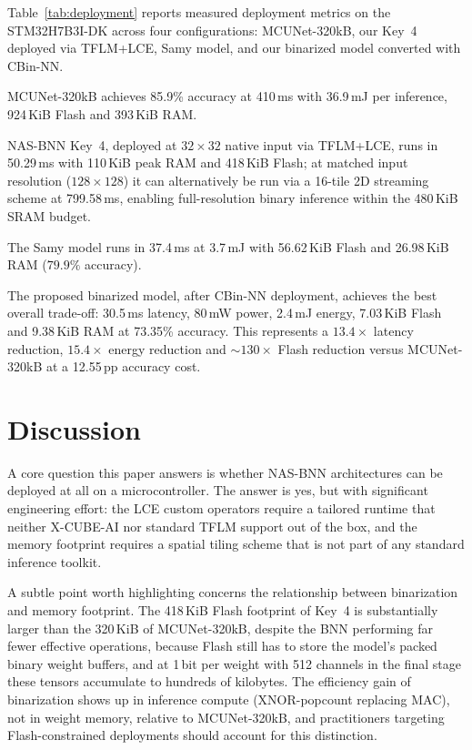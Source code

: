 \documentclass[conference]{IEEEtran}
\newcommand{\STMLATAVG}{50.29\,ms}
\newcommand{\STMARENAKIB}{110\,KiB}
\begin{document}
Table~\ref{tab:deployment} reports measured deployment metrics on the STM32H7B3I-DK across four configurations: MCUNet-320kB, our Key~4 deployed via TFLM+LCE, Samy model, and our binarized model converted with CBin-NN.

MCUNet-320kB achieves 85.9\% accuracy at 410\,ms with 36.9\,mJ per inference, 924\,KiB Flash and 393\,KiB RAM.

NAS-BNN Key~4, deployed at $32 \times 32$ native input via TFLM+LCE, runs in \STMLATAVG{} with \STMARENAKIB{} peak RAM and 418\,KiB Flash; at matched input resolution ($128 \times 128$) it can alternatively be run via a 16-tile 2D streaming scheme at 799.58\,ms, enabling full-resolution binary inference within the 480\,KiB SRAM budget.

The Samy model runs in 37.4\,ms at 3.7\,mJ with 56.62\,KiB Flash and 26.98\,KiB RAM ($79.9\%$ accuracy).

The proposed binarized model, after CBin-NN deployment, achieves the best overall trade-off: 30.5\,ms latency, 80\,mW power, 2.4\,mJ energy, 7.03\,KiB Flash and 9.38\,KiB RAM at 73.35\% accuracy. This represents a $13.4\times$ latency reduction, $15.4\times$ energy reduction and $\sim$$130\times$ Flash reduction versus MCUNet-320kB at a 12.55\,pp accuracy cost.

\section{Discussion}
\label{sec:discussion}

A core question this paper answers is whether NAS-BNN architectures can be deployed at all on a microcontroller. The answer is yes, but with significant engineering effort: the LCE custom operators require a tailored runtime that neither X-CUBE-AI nor standard TFLM support out of the box, and the memory footprint requires a spatial tiling scheme that is not part of any standard inference toolkit.

A subtle point worth highlighting concerns the relationship between binarization and memory footprint. The 418\,KiB Flash footprint of Key~4 is substantially larger than the 320\,KiB of MCUNet-320kB, despite the BNN performing far fewer effective operations, because Flash still has to store the model's packed binary weight buffers, and at 1\,bit per weight with 512 channels in the final stage these tensors accumulate to hundreds of kilobytes. The efficiency gain of binarization shows up in inference compute (XNOR-popcount replacing MAC), not in weight memory, relative to MCUNet-320kB, and practitioners targeting Flash-constrained deployments should account for this distinction.
\end{document}
